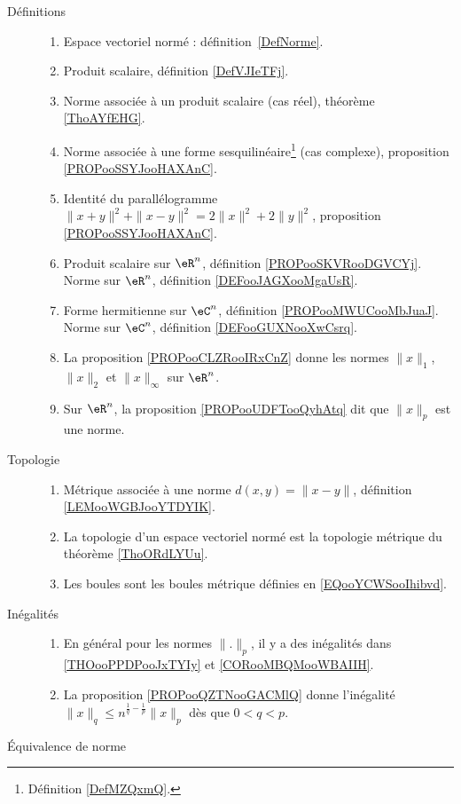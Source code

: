       \label{THEMEooUJVXooZdlmHj}

\begin{description}
	\item[Définitions]
	      \begin{enumerate}
		      \item
		            Espace vectoriel normé : définition~\ref{DefNorme}.
		      \item
		            Produit scalaire, définition \ref{DefVJIeTFj}.
		      \item
		            Norme associée à un produit scalaire (cas réel), théorème \ref{ThoAYfEHG}.
		      \item
		            Norme associée à une forme sesquilinéaire\footnote{Définition \ref{DefMZQxmQ}.} (cas complexe), proposition \ref{PROPooSSYJooHAXAnC}.
		      \item
		            Identité du parallélogramme \( \| x+y \|^2+\| x-y \|^2=2\| x \|^2+2\| y \|^2\), proposition \ref{PROPooSSYJooHAXAnC}.
		      \item
		            Produit scalaire sur \( \eR^n\), définition \ref{PROPooSKVRooDGVCYj}. Norme sur \( \eR^n\), définition \ref{DEFooJAGXooMgaUsR}.
		      \item
		            Forme hermitienne sur \( \eC^n\), définition \ref{PROPooMWUCooMbJuaJ}. Norme sur \( \eC^n\), définition \ref{DEFooGUXNooXwCsrq}.
		      \item
		            La proposition \ref{PROPooCLZRooIRxCnZ} donne les normes \( \| x \|_1\), \( \| x \|_2\) et \( \| x \|_{\infty}\) sur \( \eR^n\).
		      \item
		            Sur \( \eR^n\), la proposition \ref{PROPooUDFTooQyhAtq} dit que \( \| x \|_p\) est une norme.
	      \end{enumerate}
	\item[Topologie]
	      \begin{enumerate}
		      \item
		            Métrique associée à une norme \( d(x,y)=\| x-y \|\), définition \ref{LEMooWGBJooYTDYIK}.
		      \item
		            La topologie d'un espace vectoriel normé est la topologie métrique du théorème \ref{ThoORdLYUu}.
		      \item
		            Les boules sont les boules métrique définies en \eqref{EQooYCWSooIhibvd}.
	      \end{enumerate}
	\item[Inégalités]
	      \begin{enumerate}
		      \item
		            En général pour les normes \( \| . \|_p\), il y a des inégalités dans \ref{THOooPPDPooJxTYIy} et \ref{CORooMBQMooWBAIIH}.
		      \item
		            La proposition \ref{PROPooQZTNooGACMlQ} donne l'inégalité \( \| x \|_q\leq n^{\frac{1}{ q }-\frac{1}{ p }}\| x \|_p\) dès que \( 0<q<p\).
	      \end{enumerate}
	\item[Équivalence de norme]


\end{description}
